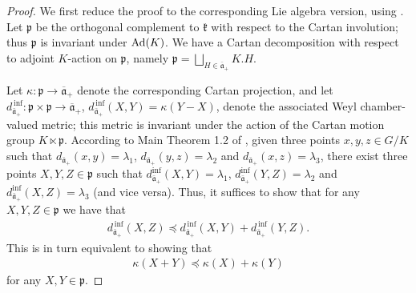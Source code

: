 \documentclass[12pt]{amsart}
\theoremstyle{remark}
\newcommand{\ga}{\mathfrak a}
\begin{document}
\begin{proof}
We first reduce the proof to the corresponding Lie algebra version, using \cite{Kapovich_Leeb_Millson_08}. Let $\mathfrak{p}$ be the orthogonal complement to $\mathfrak{k}$ with respect to the Cartan involution; thus $\mathfrak{p}$ is invariant under $\textnormal{Ad}(K)$. We have a Cartan decomposition with respect to adjoint $K$-action on $\mathfrak{p}$, namely $\mathfrak{p} = \bigsqcup_{H \in \overline{\ga}_+} K.H$.

Let $\kappa: \mathfrak{p} \to\overline{\ga}_+$ denote the corresponding Cartan projection, and let $d^{\, \inf}_{\bar{\ga}_+}: \mathfrak{p} \times \mathfrak{p} \to \overline{\ga}_+$, $d_{\bar{\ga}_+}^{\, \inf}(X, Y) = \kappa(Y-X)$, denote the associated Weyl chamber-valued metric; this metric is invariant under the action of the Cartan motion group $K \ltimes \mathfrak{p}$. According to Main Theorem 1.2 of \cite{Kapovich_Leeb_Millson_08}, given three points $x, y, z \in G/K$ such that $d_{\bar{\ga}_+}(x, y) = \lambda_1$, $d_{\bar{\ga}_+}(y, z) = \lambda_2$ and $d_{\bar{\ga}_+}(x, z) = \lambda_3$, there exist three points $X, Y, Z \in \mathfrak{p}$ such that $d_{\bar{\ga}_+}^{\inf}(X, Y) = \lambda_1$, $d_{\bar{\ga}_+}^{\inf}(Y, Z) = \lambda_2$ and $d_{\bar{\ga}_+}^{\inf}(X, Z) = \lambda_3$ (and vice versa). Thus, it suffices to show that for any $X, Y, Z \in \mathfrak{p}$ we have that
    \begin{gather*}
        d_{\bar{\ga}_+}^{\, \inf}(X, Z) \preceq d_{\bar{\ga}_+}^{\, \inf}(X, Y) + d_{\bar{\ga}_+}^{\, \inf}(Y, Z).
    \end{gather*}
This is in turn equivalent to showing that 
    \begin{gather}
        \kappa(X + Y) \preceq \kappa(X) + \kappa(Y) \label{eqn_triangle_ineq2}
    \end{gather}
for any $X, Y \in \mathfrak{p}$.


\end{proof}
\end{document}
